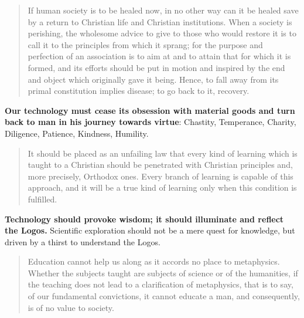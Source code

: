 \documentclass[letterpaper]{article}
\begin{document}
\begin{quote}
  If human society is to be healed now, in no other way can it be healed save by a return to Christian life and Christian institutions. When a society is perishing, the wholesome advice to give to those who would restore it is to call it to the principles from which it sprang; for the purpose and perfection of an association is to aim at and to attain that for which it is formed, and its efforts should be put in motion and inspired by the end and object which originally gave it being. Hence, to fall away from its primal constitution implies disease; to go back to it, recovery.
\end{quote}

\textbf{Our technology must cease its obsession with material goods and turn back to man in his journey towards virtue}: Chastity, Temperance, Charity, Diligence, Patience, Kindness, Humility.

\begin{quote}
  It should be placed as an unfailing law that every kind of learning which is taught to a Christian should be penetrated with Christian principles and, more precisely, Orthodox ones. Every branch of learning is capable of this approach, and it will be a true kind of learning only when this condition is fulfilled.
\end{quote}

\textbf{Technology should provoke wisdom; it should illuminate and reflect the Logos.} Scientific exploration should not be a mere quest for knowledge, but driven by a thirst to understand the Logos. 

\begin{quote}
  Education cannot help us along as it accords no place to metaphysics. Whether the subjects taught are subjects of science or of the humanities, if the teaching does not lead to a clarification of metaphysics, that is to say, of our fundamental convictions, it cannot educate a man, and consequently, is of no value to society.
\end{quote}
\end{document}
